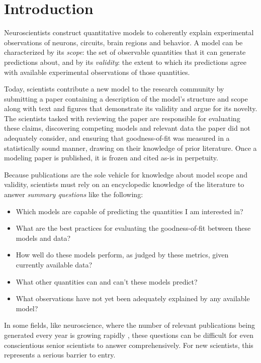 \documentclass{frontiersSCNS}
\begin{document}
\section{Introduction}
\label{sec:introduction}
Neuroscientists construct quantitative models to coherently explain experimental observations of neurons, circuits, brain regions and behavior. 
A model can be characterized by its \textit{scope}: the set of observable quantities that it can generate predictions about, and by its \textit{validity}: the extent to which its predictions agree with available experimental  observations of those quantities.

Today, scientists contribute a new model to the research community by submitting a paper containing a description of the model's structure and scope along with text and figures that demonstrate its validity and argue for its novelty.  
The scientists tasked with reviewing the paper are  responsible for evaluating these claims, discovering competing models and relevant data the paper did not adequately consider, and ensuring that goodness-of-fit was measured in a statistically sound manner, drawing on their knowledge of prior literature. 
Once a modeling paper is published, it is frozen and cited as-is in perpetuity. 

Because publications are the sole vehicle for knowledge about model scope and validity, scientists must rely on an encyclopedic knowledge of the literature to answer \emph{summary questions} like the following:
\begin{itemize}
\item Which models are capable of predicting the quantities I am interested in?
\item What are the best practices for evaluating the goodness-of-fit between these models and  data?
\item How well do these models perform, as judged by these metrics, given currently available data?
\item What other quantities can and can't these models predict?
\item What observations have not yet been adequately explained by any available model?
\end{itemize}

In some fields, like neuroscience, where the number of relevant publications being generated every year is growing rapidly \citep{jinha_article_2010}, these questions can be difficult for even conscientious senior scientists to answer comprehensively. 
For new scientists, this represents a serious barrier to entry. 
\end{document}
